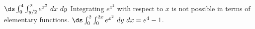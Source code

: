 {$\ds \int_0^4\int_{y/2}^2 e^{x^2}\ dx\ dy$
}
{Integrating $e^{x^2}$ with respect to $x$ is not possible in terms of elementary functions. $\ds  \int_0^2\int_0^{2x}e^{x^2}\ dy\ dx = e^4-1$.
}